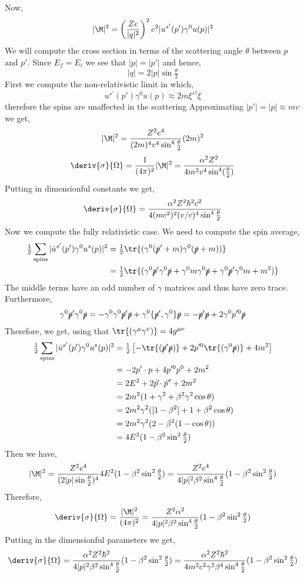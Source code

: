 \documentclass[12pt]{article}
\newcommand{\pvec}[1]{\vec{#1}\mkern2mu\vphantom{#1}}
\begin{document}
Now,
\[ |\M|^2 = \left( \frac{Z e}{|q|^2} \right)^2 e^2 | u^{s'}(p') \gamma^0 u(p) |^2 \]
We will compute the cross section in terms of the scattering angle $\theta$ between $p$ and $p'$. Since $E_f = E_i$ we see that $|p| = |p'|$ and hence,
\[ |q| = 2 |p| \sin{\tfrac{\theta}{2}} \]
First we compute the non-relativistic limit in which,
\[ u^{s'}(p') \gamma^0 u(p) \approx 2 m \xi'^\dagger \xi \]
therefore the spins are unaffected in the scattering Approximating $|p'| = |p| \approx m v$ we get,
\[ |\M|^2 = \frac{Z^2 e^4}{(2 m)^4 v^4 \sin^4{\frac{\theta}{2}}} (2 m)^2 \]
\[ \deriv{\sigma}{\Omega} = \frac{1}{(4 \pi)^2} |\M|^2 = \frac{\alpha^2 Z^2}{4 m^2 v^4 \sin^4(\frac{\theta}{2})} \]
Putting in dimensionful constants we get,
\[ \deriv{\sigma}{\Omega} = \frac{\alpha^2 Z^2 \hbar^2 c^2}{4 (mc^2)^2 (v/c)^4 \sin^4{\frac{\theta}{2}}} \]
Now we compute the fully relativistic case. We need to compute the spin average,
\begin{align*}
\tfrac{1}{2} \sum_{\text{spins}} | \bar{u}^{s'}(p') \gamma^0 u^s(p)|^2 & = \tfrac{1}{2} \tr{(\gamma^0 (\slashed{p}' + m) \gamma^0 (\slashed{p} + m))}
\\
& = \tfrac{1}{2} \tr{(\gamma^0 \slashed{p}' \gamma^0 \slashed{p} + \gamma^0 m \gamma^0 \slashed{p} + \gamma^0 \slashed{p}'\gamma^0 m + m^2)}
\end{align*}
The middle terms have an odd number of $\gamma$ matrices and thus have zero trace. Furthermore,
\[ \gamma^0 \slashed{p}' \gamma^0 \slashed{p} = - \gamma^0 \gamma^0 \slashed{p}' \slashed{p} + \gamma^0  \{ \slashed{p}', \gamma^0 \} \slashed{p} = - \slashed{p}' \slashed{p} + 2 \gamma^0 p'^0 \slashed{p} \]
Therefore, we get, using that $\tr{(\gamma^\mu \gamma^\nu)} = 4 g^{\mu \nu}$
\begin{align*}
\tfrac{1}{2} \sum_{\text{spins}} | \bar{u}^{s'}(p') \gamma^0 u^s(p)|^2 & = \tfrac{1}{2} \left[ - \tr{(\slashed{p}' \slashed{p})} + 2 p'^0 \tr{(\gamma^0 \slashed{p})} + 4m^2 \right]
\\
& = - 2 p' \cdot p + 4 p'^0 p^0 + 2 m^2
\\
& = 2 E^2 + 2 \vec{p} \cdot \pvec{p}' + 2 m^2 
\\
& = 2 m^2(1 + \gamma^2 + \beta^2 \gamma^2 \cos{\theta})
\\
& = 2 m^2 \gamma^2 ([1 - \beta^2] + 1 + \beta^2 \cos{\theta}) 
\\
& = 2 m^2 \gamma^2 (2 - \beta^2 (1 - \cos{\theta}))
\\
& = 4 E^2 (1 - \beta^2 \sin^2{\tfrac{\theta}{2}})
\end{align*}
Then we have,
\[ |\M|^2 = \frac{Z^2 e^4}{(2 |p| \sin{\tfrac{\theta}{2}})^4} 4 E^2 (1 - \beta^2 \sin^2{\tfrac{\theta}{2}}) = \frac{Z^2 e^4}{4 |p|^2 \beta^2 \sin^4{\frac{\theta}{2}}} (1 - \beta^2 \sin^2{\tfrac{\theta}{2}}) \]
Therefore,
\[ \deriv{\sigma}{\Omega} = \frac{|\M|^2}{(4 \pi)^2} = \frac{Z^2 \alpha^2}{4 |p|^2 \beta^2 \sin^4{\frac{\theta}{2}}} (1 - \beta^2 \sin^2{\tfrac{\theta}{2}}) \]
Putting in the dimensionful parameters we get,
\[ \deriv{\sigma}{\Omega} = \frac{\alpha^2 Z^2 \hbar^2}{4 |p|^2 \beta^2 \sin^4{\frac{\theta}{2}}} (1 - \beta^2 \sin^2{\tfrac{\theta}{2}}) = \frac{\alpha^2 Z^2 \hbar^2}{4 m^2 c^2 \gamma^2 \beta^4 \sin^4{\frac{\theta}{2}}} (1 - \beta^2 \sin^2{\tfrac{\theta}{2}}) \] 
\end{document}
